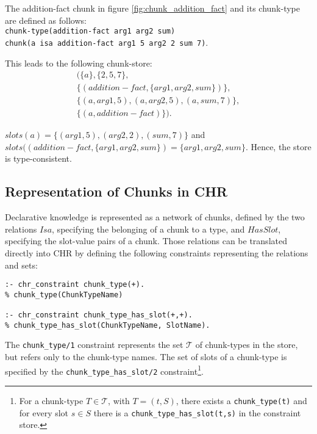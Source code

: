 
\begin{example}
 The addition-fact chunk in figure \ref{fig:chunk_addition_fact} and its chunk-type are defined as follows:\\
 \verb|chunk-type(addition-fact arg1 arg2 sum)|\\
 \verb|chunk(a isa addition-fact arg1 5 arg2 2 sum 7)|.
 
 This leads to the following chunk-store: 
 \begin{align*}
 (\{a\}, \{2,5,7\},\\ 
 \{(addition-fact, \{arg1, arg2, sum\})\},\\
 \{(a,arg1,5), (a,arg2,5), (a,sum,7)\},\\
 \{(a, addition-fact)\}).
 \end{align*}
 
 $slots(a) = \{(arg1,5), (arg2,2), (sum,7)\}$ and $slots((addition-fact,\{arg1, arg2, sum\}) = \{arg1, arg2, sum\}$. Hence, the store is type-consistent.
\end{example}

\begin{example}
\end{example}


\subsection{Representation of Chunks in CHR}

Declarative knowledge is represented as a network of chunks, defined by the two relations $Isa$, specifying the belonging of a chunk to a type, and $HasSlot$, specifying the slot-value pairs of a chunk. Those relations can be translated directly into CHR by defining the following constraints representing the relations and sets:

\begin{lstlisting}
:- chr_constraint chunk_type(+).
% chunk_type(ChunkTypeName)

:- chr_constraint chunk_type_has_slot(+,+).
% chunk_type_has_slot(ChunkTypeName, SlotName).
\end{lstlisting}

The \verb|chunk_type/1| constraint represents the set $\mathcal{T}$ of chunk-types in the store, but refers only to the chunk-type names. The set of slots of a chunk-type is specified by the \verb|chunk_type_has_slot/2| constraint\footnote{For a chunk-type $T \in \mathcal{T}$, with $T = (t, S)$, there exists a \texttt{chunk\_type(t)} and for every slot $s \in S$ there is a \texttt{chunk\_type\_has\_slot(t,s)} in the constraint store.}.


